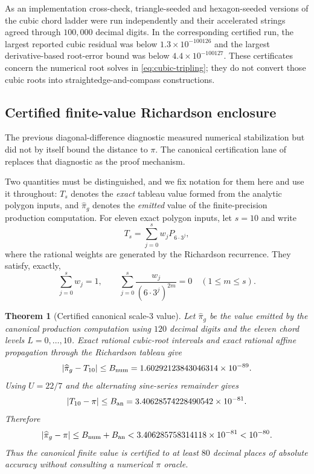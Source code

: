 \documentclass[12pt]{article}
\newtheorem{theorem}{Theorem}[section]
\theoremstyle{definition}
\theoremstyle{remark}
\newcommand{\abs}[1]{\left|#1\right|}
\begin{document}
As an implementation cross-check, triangle-seeded and hexagon-seeded versions
of the cubic chord ladder were run independently and their accelerated strings
agreed through $100{,}000$ decimal digits.  In the corresponding certified run,
the largest reported cubic residual was below
$1.3\times10^{-100126}$ and the largest derivative-based root-error bound was
below $4.4\times10^{-100127}$.  These certificates concern the numerical root
solves in \eqref{eq:cubic-tripling}; they do not convert those cubic roots into
straightedge-and-compass constructions.


\subsection{Certified finite-value Richardson enclosure}
\label{subsec:certified-enclosure}

The previous diagonal-difference diagnostic measured numerical stabilization
but did not by itself bound the distance to $\pi$.  The canonical certification
lane of~\cite{baker-certification} replaces that diagnostic as the proof
mechanism.

Two quantities must be distinguished, and we fix notation for them here and use
it throughout: $T_s$ denotes the \emph{exact} tableau value formed from the
analytic polygon inputs, and $\widehat\pi_g$ denotes the \emph{emitted} value of
the finite-precision production computation.  For eleven exact polygon inputs,
let $s=10$ and write
\[
  T_s=\sum_{j=0}^{s}w_jP_{6\cdot3^j},
\]
where the rational weights are generated by the Richardson recurrence.  They
satisfy, exactly,
\[
  \sum_{j=0}^{s}w_j=1,
  \qquad
  \sum_{j=0}^{s}\frac{w_j}{(6\cdot3^j)^{2m}}=0
  \quad(1\le m\le s).
\]

\begin{theorem}[Certified canonical scale-$3$ value]
\label{thm:certified-canonical-value}
Let $\widehat\pi_g$ be the value emitted by the canonical production computation
using $120$ decimal digits and the eleven chord levels $L=0,\ldots,10$.  Exact
rational cubic-root intervals and exact rational affine propagation through the
Richardson tableau give
\[
  \abs{\widehat\pi_g-T_{10}}
  \le
  B_{\rm num}
  =1.60292123843046314\times10^{-89}.
\]
Using $U=22/7$ and the alternating sine-series remainder gives
\[
  \abs{T_{10}-\pi}
  \le
  B_{\rm an}
  =3.40628574228490542\times10^{-81}.
\]
Therefore
\begin{equation}
  \abs{\widehat\pi_g-\pi}
  \le B_{\rm num}+B_{\rm an}
  <3.406285758314118\times10^{-81}
  <10^{-80}.
  \label{eq:certified-r9-bound}
\end{equation}
Thus the canonical finite value is certified to at least $80$ decimal places
of absolute accuracy without consulting a numerical $\pi$ oracle.
\end{theorem}
\end{document}
